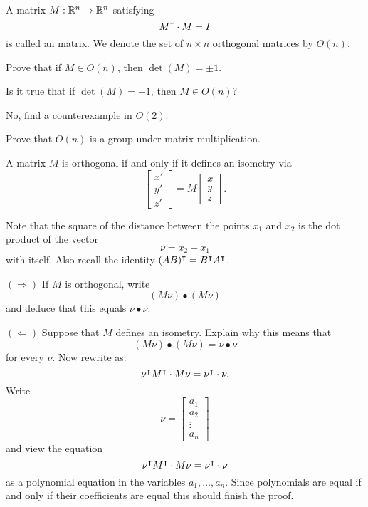 \documentclass{ximera}
\begin{document}
\begin{definition}
  A matrix $M:\mathbb R^n\to \mathbb R^n$ satisfying
  \[
  M^\intercal \cdot M=I
  \]
  is called an  matrix. We denote the set of $n\times
  n$ orthogonal matrices by $O(n)$.
\end{definition}


\begin{exercise}
  Prove that if $M\in O(n)$, then $\det(M) = \pm 1$.
\end{exercise}

\begin{exercise}
  Is it true that if $\det(M) = \pm 1$, then $M \in O(n)$?
  \begin{hint}
    No, find a counterexample in $O(2)$.
  \end{hint}
\end{exercise}


\begin{exercise}
  Prove that $O(n)$ is a group under matrix multiplication.
\end{exercise}




\begin{lemma}
  A matrix $M$ is orthogonal if and only if it defines an isometry via
  \[
  \begin{bmatrix}
    x' \\ y' \\ z'
  \end{bmatrix}
  = M \begin{bmatrix} x \\ y \\ z\end{bmatrix}.
  \]
  \begin{sketch}
    Note that the square of the distance between the points $x_{1}$
    and $x_{2}$ is the dot product of the vector%
    \[
    \nu=x_{2}-x_{1}%
    \]
    with itself.  Also recall the identity
    $(AB)^\intercal=B^\intercal A^\intercal$.
    
    $(\Rightarrow)$ If $M$ is orthogonal, write
    \[
    (M\nu) \bullet (M\nu)
    \]
    and deduce that this equals ${\nu}\bullet{\nu}$.

    $(\Leftarrow)$ Suppose that $M$ defines an isometry. Explain why
    this means that
    \[
    ( M{\nu}) \bullet ( M{\nu})=
    {\nu} \bullet {\nu}
    \]
    for every ${\nu}$.  Now rewrite as:
    \[
    \nu^\intercal M^\intercal \cdot M\nu=\nu^\intercal
    \cdot{\nu}.
    \]
    Write
    \[
    {\nu} =
    \begin{bmatrix}
      a_1 \\ a_2 \\ \vdots \\ a_n
    \end{bmatrix}
    \]
     and view the equation 
    \[
    \nu^\intercal M^\intercal \cdot M\nu=\nu^\intercal
    \cdot{\nu}
    \]
    as a polynomial equation in the variables $a_1,\dots,a_n$. Since
    polynomials are equal if and only if their coefficients are equal
    this should finish the proof.
  \end{sketch}
\end{lemma}
\end{document}
